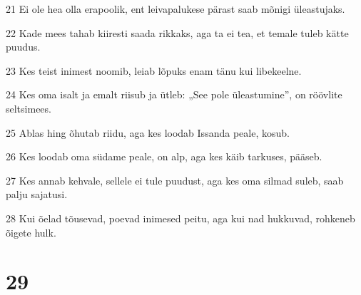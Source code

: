 \par 21 Ei ole hea olla erapoolik, ent leivapalukese pärast saab mõnigi üleastujaks.
\par 22 Kade mees tahab kiiresti saada rikkaks, aga ta ei tea, et temale tuleb kätte puudus.
\par 23 Kes teist inimest noomib, leiab lõpuks enam tänu kui libekeelne.
\par 24 Kes oma isalt ja emalt riisub ja ütleb: „See pole üleastumine”, on röövlite seltsimees.
\par 25 Ablas hing õhutab riidu, aga kes loodab Issanda peale, kosub.
\par 26 Kes loodab oma südame peale, on alp, aga kes käib tarkuses, pääseb.
\par 27 Kes annab kehvale, sellele ei tule puudust, aga kes oma silmad suleb, saab palju sajatusi.
\par 28 Kui õelad tõusevad, poevad inimesed peitu, aga kui nad hukkuvad, rohkeneb õigete hulk.

\chapter{29}

